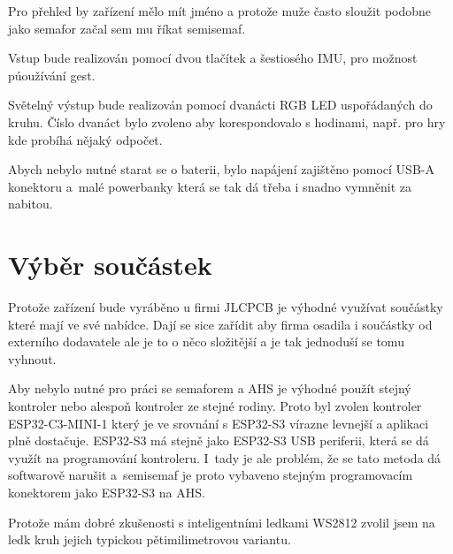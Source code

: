


Pro přehled by zařízení mělo mít jméno a protože muže často sloužit podobne jako semafor začal sem mu říkat semisemaf.

Vstup bude realizován pomocí dvou tlačítek a šestiosého IMU, pro možnost púoužívání gest.

Světelný výstup bude realizován pomocí dvanácti RGB LED uspořádaných do kruhu.
Číslo dvanáct bylo zvoleno aby korespondovalo s hodinami, např. pro hry kde probíhá nějaký odpočet.

Abych nebylo nutné starat se o baterii, bylo napájení zajištěno pomocí USB-A konektoru a~malé powerbanky která se tak dá třeba i snadno vymněnit za nabitou.

\section{Výběr součástek}
Protože zařízení bude vyráběno u firmi JLCPCB je výhodné využívat součástky které mají ve své nabídce.
Dají se sice zařídit aby firma osadila i součástky od externího dodavatele ale je to o něco složitější a je tak jednoduší se tomu vyhnout.

Aby nebylo nutné pro práci se semaforem a AHS je výhodné použít stejný kontroler nebo alespoň kontroler ze stejné rodiny.
Proto byl zvolen kontroler ESP32-C3-MINI-1 který je ve srovnání s ESP32-S3 vírazne levnejší a aplikaci plně dostačuje. 
ESP32-S3 má stejně jako ESP32-S3 USB periferii, která se dá využít na programování kontroleru.
I~tady je ale problém, že se tato metoda dá softwarově narušit a~semisemaf je proto vybaveno stejným programovacím konektorem jako ESP32-S3 na AHS.

Protože mám dobré zkušenosti s inteligentními ledkami WS2812 zvolil jsem na ledk kruh jejich typickou pětimilimetrovou variantu.

